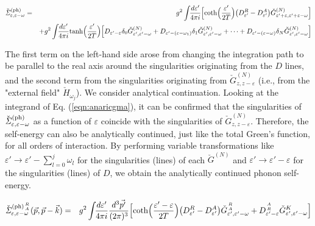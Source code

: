 \documentclass[uplatex,a4j,12pt,dvipdfmx]{jsarticle}
\begin{document}
\begin{eqnarray}
	\check{\mathit{\Sigma}}^{(\rm ph)}_{\varepsilon , \varepsilon - \omega}
	&=&
	g^{2} \int \!\! \dfrac{d \varepsilon'}{4 \pi i}
	\Big[
		{\rm coth} \Big( \dfrac{\varepsilon'}{2T} \Big)
		\big( D^{R}_{\varepsilon'} - D^{A}_{\varepsilon'} \big)
		\check{G}_{ \varepsilon' + \varepsilon , \varepsilon' + \varepsilon - \omega }^{(N)} \Big]
	\nonumber \\ && +
	g^{2} \int \!\! \dfrac{d \varepsilon'}{4 \pi i}
	{\rm tanh} \Big( \dfrac{\varepsilon'}{2T} \Big)
	\Big[
		D_{\varepsilon' - \varepsilon} \delta_{0} \check{G}^{(N)}_{\varepsilon' , \varepsilon' - \omega}
		+
		D_{\varepsilon' - (\varepsilon - \omega_{1})} \delta_{1} \check{G}^{(N)}_{\varepsilon' , \varepsilon' - \omega}
		+ \cdots +
		D_{\varepsilon' - (\varepsilon - \omega)} \delta_{N} \check{G}^{(N)}_{\varepsilon' , \varepsilon' - \omega}
		\Big]
	\label{eqn:anaricgma}
\end{eqnarray}

The first term on the left-hand side arose from changing the integration path to be parallel to the real axis around the singularities originating from the $D$ lines, and the second term from the singularities originating from $\check{G}_{z,z-\varepsilon}^{(N)}$ (i.e., from the "external field" $\check{H}_{\omega_{j}}$).
We consider analytical continuation.
Looking at the integrand of Eq. (\ref{eqn:anaricgma}), it can be confirmed that the singularities of $\check{\mathit{\Sigma}}^{(\rm ph)}_{\varepsilon , \varepsilon - \omega}$ as a function of $\varepsilon$ coincide with the singularities of $\check{G}_{z,z-\varepsilon}^{(N)}$.
Therefore, the self-energy can also be analytically continued, just like the total Green's function, for all orders of interaction.
By performing variable transformations like $\displaystyle \varepsilon' \to \varepsilon' - \sum_{l=0}^{j} \omega_{l}$ for the singularities (lines) of each $\check{G}^{(N)}$ and $\displaystyle \varepsilon' \to \varepsilon' - \varepsilon$ for the singularities (lines) of $D$, we obtain the analytically continued phonon self-energy.

\begin{eqnarray}
	\check{\mathit{\Sigma}}^{{(\rm ph)} {{R}\atop{A}} }_{\varepsilon , \varepsilon - \omega} (\vec{p} , \vec{p} - \vec{k})
	&=&
	g^{2} \int \!\! \dfrac{d \varepsilon'}{4 \pi i} \dfrac{d^{3} \vec{p'}}{ (2 \pi)^{3}}
	\Big[
		{\rm coth} \Big( \dfrac{ \varepsilon' - \varepsilon }{2T} \Big)
		\big( D^{R}_{\varepsilon'} - D^{A}_{\varepsilon'} \big)
		\check{G}^{ {{R}\atop{A}} }_{ \varepsilon' , \varepsilon'- \omega }
		+
		D^{ {{A}\atop{R}} }_{\varepsilon' - \varepsilon} \check{G}^{K}_{ \varepsilon' , \varepsilon'- \omega }
		\Big]
\end{eqnarray}
\end{document}
